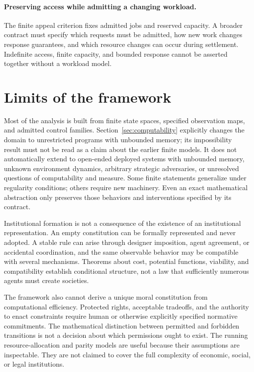 \documentclass[11pt,letterpaper]{article}
\theoremstyle{plain}
\theoremstyle{definition}
\theoremstyle{remark}
\begin{document}
\paragraph{Preserving access while admitting a changing workload.}
The finite appeal criterion fixes admitted jobs and reserved capacity. A broader contract must specify which requests must be admitted, how new work changes response guarantees, and which resource changes can occur during settlement. Indefinite access, finite capacity, and bounded response cannot be asserted together without a workload model.

\section{Limits of the framework}\label{sec:limits}

Most of the analysis is built from finite state spaces, specified observation maps, and admitted control families. Section~\ref{sec:computability} explicitly changes the domain to unrestricted programs with unbounded memory; its impossibility result must not be read as a claim about the earlier finite models. It does not automatically extend to open-ended deployed systems with unbounded memory, unknown environment dynamics, arbitrary strategic adversaries, or unresolved questions of computability and measure. Some finite statements generalize under regularity conditions; others require new machinery. Even an exact mathematical abstraction only preserves those behaviors and interventions specified by its contract.

Institutional formation is not a consequence of the existence of an institutional representation. An empty constitution can be formally represented and never adopted. A stable rule can arise through designer imposition, agent agreement, or accidental coordination, and the same observable behavior may be compatible with several mechanisms. Theorems about cost, potential functions, viability, and compatibility establish conditional structure, not a law that sufficiently numerous agents must create societies.

The framework also cannot derive a unique moral constitution from computational efficiency. Protected rights, acceptable tradeoffs, and the authority to enact constraints require human or otherwise explicitly specified normative commitments. The mathematical distinction between permitted and forbidden transitions is not a decision about which permissions ought to exist. The running resource-allocation and parity models are useful because their assumptions are inspectable. They are not claimed to cover the full complexity of economic, social, or legal institutions.
\end{document}
